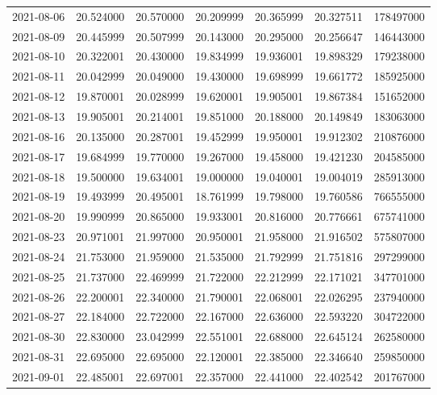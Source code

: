 \begin{tabular}{lrrrrrr}
2021-08-06 &   20.524000 &   20.570000 &   20.209999 &   20.365999 &   20.327511 &   178497000 \\
2021-08-09 &   20.445999 &   20.507999 &   20.143000 &   20.295000 &   20.256647 &   146443000 \\
2021-08-10 &   20.322001 &   20.430000 &   19.834999 &   19.936001 &   19.898329 &   179238000 \\
2021-08-11 &   20.042999 &   20.049000 &   19.430000 &   19.698999 &   19.661772 &   185925000 \\
2021-08-12 &   19.870001 &   20.028999 &   19.620001 &   19.905001 &   19.867384 &   151652000 \\
2021-08-13 &   19.905001 &   20.214001 &   19.851000 &   20.188000 &   20.149849 &   183063000 \\
2021-08-16 &   20.135000 &   20.287001 &   19.452999 &   19.950001 &   19.912302 &   210876000 \\
2021-08-17 &   19.684999 &   19.770000 &   19.267000 &   19.458000 &   19.421230 &   204585000 \\
2021-08-18 &   19.500000 &   19.634001 &   19.000000 &   19.040001 &   19.004019 &   285913000 \\
2021-08-19 &   19.493999 &   20.495001 &   18.761999 &   19.798000 &   19.760586 &   766555000 \\
2021-08-20 &   19.990999 &   20.865000 &   19.933001 &   20.816000 &   20.776661 &   675741000 \\
2021-08-23 &   20.971001 &   21.997000 &   20.950001 &   21.958000 &   21.916502 &   575807000 \\
2021-08-24 &   21.753000 &   21.959000 &   21.535000 &   21.792999 &   21.751816 &   297299000 \\
2021-08-25 &   21.737000 &   22.469999 &   21.722000 &   22.212999 &   22.171021 &   347701000 \\
2021-08-26 &   22.200001 &   22.340000 &   21.790001 &   22.068001 &   22.026295 &   237940000 \\
2021-08-27 &   22.184000 &   22.722000 &   22.167000 &   22.636000 &   22.593220 &   304722000 \\
2021-08-30 &   22.830000 &   23.042999 &   22.551001 &   22.688000 &   22.645124 &   262580000 \\
2021-08-31 &   22.695000 &   22.695000 &   22.120001 &   22.385000 &   22.346640 &   259850000 \\
2021-09-01 &   22.485001 &   22.697001 &   22.357000 &   22.441000 &   22.402542 &   201767000 \\

\end{tabular}
